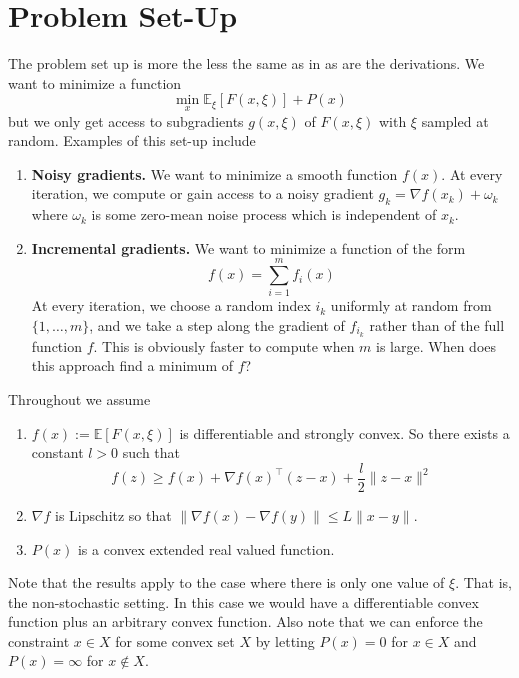 
\section{Problem Set-Up} 
The problem set up is more the less the same as in \cite{Hazan2011} as are the derivations. We want to minimize a function 
\begin{equation}\label{eq:origpro}
\min_x \mathbb{E}_\xi [F(x,\xi)]+P(x)
\end{equation}
but we only get access to subgradients $g(x,\xi)$ of $F(x,\xi)$ with $\xi$ sampled at random. Examples of this set-up include
\begin{enumerate}
\item {\bf Noisy gradients.} We want to minimize a smooth function $f(x)$. At every iteration, we compute or gain access to a noisy gradient $g_k=\nabla f(x_k)+\omega_k$ where $\omega_k$ is some zero-mean noise process which is independent of $x_k$.
\item {\bf Incremental gradients.} We want to minimize a function of the form
$$ 
f(x)=\sum_{i=1}^{m}f_i(x)
$$
At every iteration, we choose a random index $i_k$ uniformly at random from $\{1,\ldots,m\}$, and we take a step along the gradient of $f_{i_k}$ rather than of the full function $f$. This is obviously faster to compute when $m$ is large. When does this approach find a minimum of $f$?
\end{enumerate}

Throughout we assume
\begin{enumerate}
\item $f(x):=\mathbb{E}[F(x,\xi)]$ is differentiable and strongly convex. So there exists a constant $l>0$ such that 
\begin{equation}
f(z)\geq f(x)+\nabla f(x)^\top (z-x)+\frac{l}{2}\|z-x\|^2
\end{equation}
\item $\nabla f$ is Lipschitz so that $\|\nabla f(x) - \nabla f(y)\|\leq L \|x-y\|$.
\item $P(x)$ is a convex extended real valued function.
\end{enumerate}
Note that the results apply to the case where there is only one value of $\xi$. That is, the non-stochastic setting. In this case we would have a differentiable convex function plus an arbitrary convex function. Also note that we can enforce the constraint $x \in X$ for some convex set $X$ by letting $P(x)=0$ for $x\in X$ and $P(x)=\infty$ for $x\notin X$.

